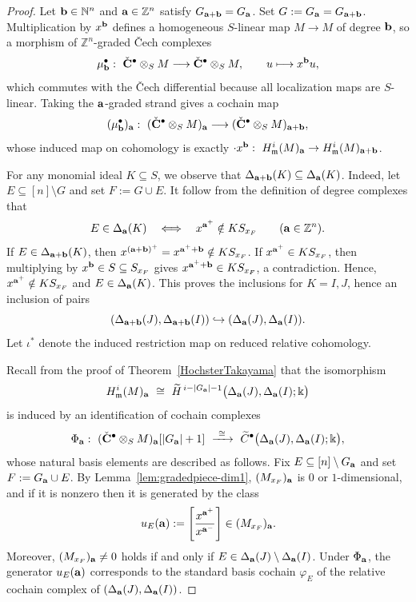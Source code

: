 \documentclass[10pt,a4paper]{amsart}
\newcommand{\NN}{{\mathbb N}}
\newcommand{\ZZ}{{\mathbb Z}}
\def\a{{\bold a}}
\def\b{{\bold b}}
\def\kk{{\Bbbk}}
\def\mm{{\mathfrak m}}
\begin{document}
\begin{proof}
	Let $\b\in\NN^n$ and $\a\in\ZZ^n$ satisfy $G_{\a+\b}=G_\a$. Set $G:=G_\a=G_{\a+\b}$.
	Multiplication by $x^\b$ defines a homogeneous $S$-linear map $M\to M$ of degree $\b$, so a morphism of
	$\ZZ^n$-graded \v{C}ech complexes
	\[
	\mu_\b^\bullet:\ \Check{\bf C}^\bullet\otimes_S M \longrightarrow \Check{\bf C}^\bullet\otimes_S M,
	\qquad
	u\longmapsto x^\b u,
	\]
	which commutes with the \v{C}ech differential because all localization maps are $S$-linear. Taking the $\a$-graded
	strand gives a cochain map
	\[
	(\mu_\b^\bullet)_\a:\ (\Check{\bf C}^\bullet\otimes_S M)_\a \longrightarrow (\Check{\bf C}^\bullet\otimes_S M)_{\a+\b},
	\]
	whose induced map on cohomology is exactly $\cdot x^\b:\ H^i_\mm(M)_\a\to H^i_\mm(M)_{\a+\b}$.
	
	For any monomial ideal $K \subseteq S$, we observe that $\Delta_{\a+\b}(K)\subseteq \Delta_\a(K)$.
	Indeed, let $E\subseteq[n]\setminus G$ and set $F:=G\cup E$. It follow from the definition of degree complexes that
	\[
	E\in\Delta_{\a}(K)\quad\Longleftrightarrow\quad x^{\a^+}\notin K S_{x_F}\qquad(\a\in\ZZ^n).
	\]
	If $E\in\Delta_{\a+\b}(K)$, then $x^{(\a+\b)^+}=x^{\a^++\b}\notin K S_{x_F}$. If $x^{\a^+}\in K S_{x_F}$, then multiplying
	by $x^\b\in S\subseteq S_{x_F}$ gives $x^{\a^++\b}\in K S_{x_F}$, a contradiction. Hence, $x^{\a^+}\notin K S_{x_F}$ and
	$E\in\Delta_\a(K)$. This proves the inclusions for $K=I,J$, hence an inclusion of pairs
	\[
	(\Delta_{\a+\b}(J),\Delta_{\a+\b}(I))\hookrightarrow (\Delta_\a(J),\Delta_\a(I)).
	\]
	Let $\iota^\ast$ denote the induced restriction map on reduced relative cohomology.
	
	Recall from the proof of Theorem~\ref{HochsterTakayama} that the isomorphism
	\[
	H^i_\mm(M)_\a\ \cong\ \widetilde H^{\,i-|G_\a|-1}\big(\Delta_\a(J),\Delta_\a(I);\kk\big)
	\]
	is induced by an identification of cochain complexes
	\[
	\Phi_\a:\ (\Check{\bf C}^\bullet\otimes_S M)_\a[|G_\a|+1]\ \xrightarrow{\ \cong\ }\
	\widetilde C^\bullet\big(\Delta_\a(J),\Delta_\a(I);\kk\big),
	\]
	whose natural basis elements are described as follows.
	Fix $E\subseteq[n]\setminus G_\a$ and set $F:=G_\a\cup E$. By Lemma~\ref{lem:gradedpiece-dim1},
	$(M_{x_F})_\a$ is $0$ or $1$-dimensional, and if it is nonzero then it is generated by the class
	\[
	u_E(\a):=\left[\frac{x^{\a^+}}{x^{\a^-}}\right]\in (M_{x_F})_\a.
	\]
	Moreover, $(M_{x_F})_\a\neq 0$ holds if and only if $E\in\Delta_\a(J)\setminus\Delta_\a(I)$.
	Under $\Phi_\a$, the generator $u_E(\a)$ corresponds to the standard basis cochain $\varphi_E$ of the relative
	cochain complex of $(\Delta_\a(J),\Delta_\a(I))$.
	

\end{proof}
\end{document}
